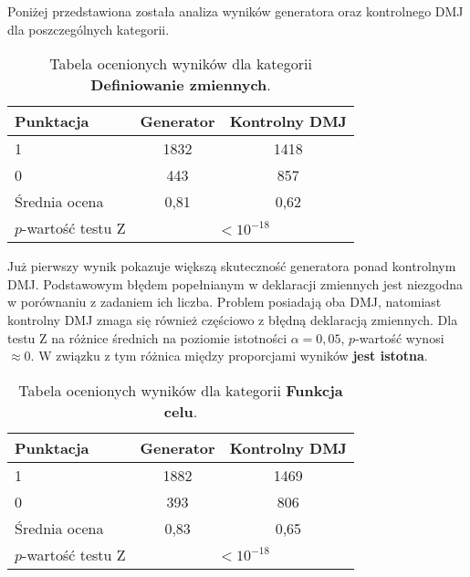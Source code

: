 Poniżej przedstawiona została analiza wyników generatora oraz kontrolnego DMJ dla poszczególnych kategorii.

\begin{table}[H]
\caption{Tabela ocenionych wyników dla kategorii \textbf{Definiowanie zmiennych}.}\label{tab:tabela12}
\centering%
\begin{tabular}{|l|c|c|}
\hline
\textbf{Punktacja} & \textbf{Generator} & \textbf{Kontrolny DMJ}\\
\hline
1 & 1832 & 1418 \\
\hline
0 & 443 & 857 \\
\hline
Średnia ocena & 0,81 & 0,62 \\
\hline
$p$-wartość testu Z&\multicolumn{2}{c|}{$<10^{-18}$}\\
\hline
\end{tabular}
\end{table}


Już pierwszy wynik pokazuje większą skuteczność generatora ponad kontrolnym DMJ. Podstawowym błędem popełnianym w deklaracji zmiennych jest niezgodna w porównaniu z zadaniem ich liczba. Problem posiadają oba DMJ, natomiast kontrolny DMJ zmaga się również częściowo z błędną deklaracją zmiennych. Dla testu Z na różnice średnich na poziomie istotności $\alpha = 0,05$, %
$p$-wartość wynosi $\approx 0$. W związku z tym różnica między proporcjami wyników \textbf{jest istotna}.


\begin{table}[H]
\caption{Tabela ocenionych wyników dla kategorii \textbf{Funkcja celu}.}\label{tab:tabela13}
\centering%
\begin{tabular}{|l|c|c|}
\hline
\textbf{Punktacja} & \textbf{Generator} & \textbf{Kontrolny DMJ}\\
\hline
1 & 1882 & 1469 \\
\hline
0 & 393 & 806 \\
\hline
Średnia ocena & 0,83 & 0,65 \\
\hline
$p$-wartość testu Z&\multicolumn{2}{c|}{$<10^{-18}$}\\
\hline
\end{tabular}
\end{table}

